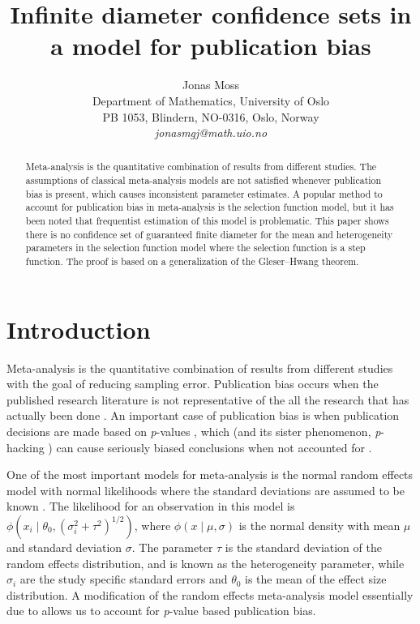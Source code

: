 \documentclass[twoside]{article}
\title{Infinite diameter confidence sets in a model for publication bias}
\author{
  Jonas Moss \orcid{0000-0002-6876-6964} \\
  Department of Mathematics, University of Oslo\\
  PB 1053, Blindern, NO-0316, Oslo, Norway \\
  \it{jonasmgj@math.uio.no}
}
\begin{document}
\maketitle
\begin{abstract}
Meta-analysis is the quantitative combination of results from different studies. The assumptions of classical meta-analysis models are not satisfied whenever publication bias is present, which causes inconsistent parameter estimates. A popular method to account for publication bias in meta-analysis is the selection function model, but it has been noted that frequentist estimation of this model is problematic. This paper shows there is no confidence set of guaranteed finite diameter for the mean and heterogeneity parameters in the selection function model where the selection function is a step function. The proof is based on a generalization of the Gleser--Hwang theorem.
\end{abstract}

\section{Introduction}

Meta-analysis is the quantitative combination of results from different studies \citep{lipsey2001practical} with the goal of reducing sampling error.
Publication bias occurs when the published research literature is
not representative of the all the research that has actually been
done \citep{rothstein2006publication}. An important case of publication
bias is when publication decisions are made based on \textit{p}-values
\citep{sterling1959publication}, which (and its sister phenomenon, \textit{p}-hacking \citep{simmons2011false})
can cause seriously biased conclusions when not accounted
for \citep{simmons2011false,moss2019modelling}.

One of the most important models for meta-analysis is the normal random effects
model with normal likelihoods where the
standard deviations are assumed to be known \citep{hedges1998fixed}.
The likelihood for an observation in this model is $\phi(x_{i}\mid\theta_{0},(\sigma_{i}^{2}+\tau^{2})^{1/2})$,
where $\phi(x\mid\mu,\sigma)$ is the normal density with
mean $\mu$ and standard deviation $\sigma$. The parameter $\tau$ is the standard deviation of the random effects distribution, and is known as the heterogeneity parameter, while $\sigma_i$ are the study specific standard errors and $\theta_0$ is the mean of the effect size distribution. A modification of the random
effects meta-analysis model essentially due to \citet{hedges1984estimation}
allows us to account for \textit{p}-value based publication bias.
\end{document}
